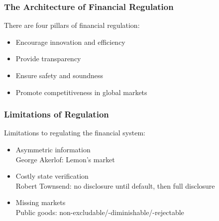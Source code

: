\documentclass[11pt]{beamer}
\begin{document}

\begin{frame}

\frametitle{The Architecture of Financial Regulation}
There are four pillars of financial regulation:
\begin{itemize}\itemsep10pt
\item Encourage innovation and efficiency
\item Provide transparency
\item Ensure safety and soundness
\item Promote competitiveness in global markets
\end{itemize}
		\end{frame}


\begin{frame}
\frametitle{Limitations of Regulation}
Limitations to regulating the financial system:
\begin{itemize}\itemsep10pt
\item Asymmetric information\\
\quad \quad George Akerlof: Lemon's market
\item Costly state verification\\
\quad \quad Robert Townsend: no disclosure until default, then full disclosure
\item Missing markets\\
\quad \quad Public goods: non-excludable/-diminishable/-rejectable
\end{itemize}
\end{frame}

%
\end{document}
